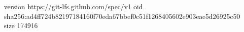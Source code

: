 version https://git-lfs.github.com/spec/v1
oid sha256:ad4ff724b82197184160f70eda67bbef0c51f1268405602e903eae5d26925c50
size 174916
